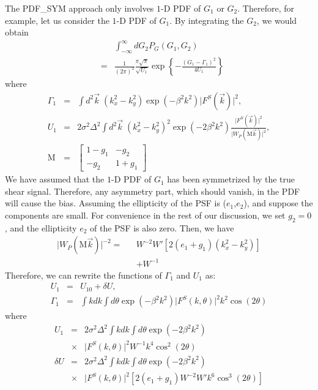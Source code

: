 \documentclass[twocolumn]{aastex62}
\begin{document}
The PDF\_SYM approach only involves $1$-D PDF of $G_1$ or $G_2$. Therefore, for example, let us consider the $1$-D PDF of $G_1$. By integrating the $G_2$, we would obtain
\begin{eqnarray}
\label{1d_PDF}
&&\int_{-\infty}^{\infty}dG_2 P_G\left(G_1,G_2\right)\\ \nonumber
&=&\frac{1}{(2\pi)^2}\frac{\pi\sqrt{\pi}}{\sqrt{U_1}}\exp\left\{-\frac{\left(G_1-\Gamma_1\right)^2}{4U_1}\right\}
\end{eqnarray}
where
\begin{eqnarray}
\Gamma_1&=&\int{d}^2\vec{k}\;\left(k_x^2-k_y^2\right)\exp(-\beta^2k^2)\vert F^S(\vec{k})\vert^2, \\ \nonumber
U_1&=&2\sigma^2\Delta^2\int{d}^2\vec{k} \; \left(k_x^2-k_y^2\right)^2\exp(-2\beta^2k^2)\frac{\vert F^S(\vec{k})\vert^2}{\vert W_{P}(\mathrm{M}\vec{k})\vert^2}, \\ \nonumber
\mathrm{M}&=&\left[\begin{array}{cc}
1-g_1 &  -g_2 \\
-g_2 &  1+g_1 
\end{array}\right]
\end{eqnarray}
We have assumed that the $1$-D PDF of $G_1$ has been symmetrized by the true shear signal. Therefore, any asymmetry part, which should vanish, in the PDF will cause the bias. Assuming the ellipticity of the PSF is ($e_1$,$e_2$), and suppose the components are small. For convenience in the rest of our discussion, we set $g_2=0$, and the ellipticity $e_2$ of the PSF is also zero. Then, we have
\begin{eqnarray}
\vert W_{P}(\mathrm{M}\vec{k})\vert^{-2}=&& W^{-2}W'[2(e_1+g_1)(k_x^2-k_y^2)] \\ \nonumber&&+W^{-1}
\end{eqnarray}
Therefore, we can rewrite the functions of $\Gamma_1$ and $U_1$ as:
\begin{eqnarray}
U_1&=&U_{10}+\delta U,\\ \nonumber
\Gamma_1&=&\int kdk\int d\theta \exp(-\beta^2k^2)\vert F^S(k,\theta)\vert^2k^2\cos(2\theta)
\end{eqnarray}
where
\begin{eqnarray}
U_1 &=& 2\sigma^2\Delta^2\int kdk\int d\theta\exp(-2\beta^2k^2) \\ \nonumber
&\times&\vert F^S(k,\theta)\vert^2W^{-1}k^4 \cos^2(2\theta) \\ \nonumber
\delta U &=& 2\sigma^2\Delta^2\int kdk\int d\theta\exp(-2\beta^2k^2) \\ \nonumber
&\times&\vert F^S(k,\theta)\vert^2\left[ 2(e_1+g_1)W^{-2}W'k^6\cos^3(2\theta)\right]
\end{eqnarray}
\end{document}
